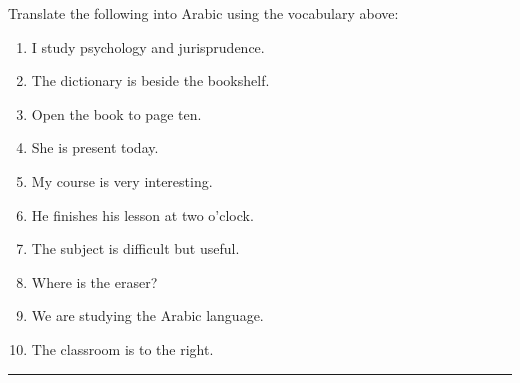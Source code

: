 \documentclass[
  a4paper,
  DIV=11,
  numbers=noendperiod]{scrartcl}
\providecommand{\tightlist}{%
  \setlength{\itemsep}{0pt}\setlength{\parskip}{0pt}}
\begin{document}
\begin{tcolorbox}[enhanced jigsaw, bottomrule=.15mm, arc=.35mm, colbacktitle=quarto-callout-note-color!10!white, opacityback=0, toptitle=1mm, title=\textcolor{quarto-callout-note-color}{\faInfo}\hspace{0.5em}{Try This!}, colframe=quarto-callout-note-color-frame, opacitybacktitle=0.6, colback=white, coltitle=black, titlerule=0mm, left=2mm, toprule=.15mm, bottomtitle=1mm, rightrule=.15mm, leftrule=.75mm, breakable]

Translate the following into Arabic using the vocabulary above:

\begin{enumerate}
\def\labelenumi{\arabic{enumi}.}
\tightlist
\item
  I study psychology and jurisprudence.\\
\item
  The dictionary is beside the bookshelf.\\
\item
  Open the book to page ten.\\
\item
  She is present today.\\
\item
  My course is very interesting.\\
\item
  He finishes his lesson at two o'clock.\\
\item
  The subject is difficult but useful.\\
\item
  Where is the eraser?\\
\item
  We are studying the Arabic language.\\
\item
  The classroom is to the right.
\end{enumerate}

\end{tcolorbox}

\begin{center}\rule{0.5\linewidth}{0.5pt}\end{center}
\end{document}
